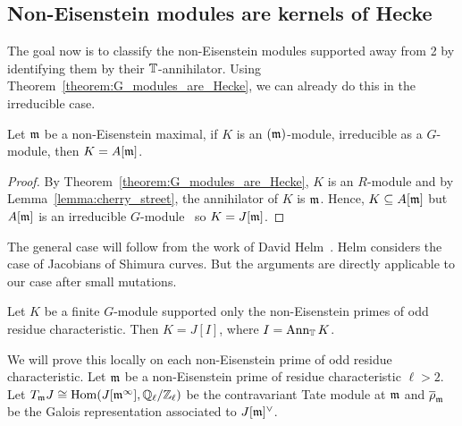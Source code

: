 \documentclass{article}
\begin{document}
\subsection{Non-Eisenstein modules are kernels of Hecke}%
\label{sub:non_eisenstein_modules_are_kernels_of_hecke}

The goal now is to classify the non-Eisenstein modules supported away from 2 by
identifying them by their $\mathbb{T}$-annihilator. Using
Theorem~\ref{theorem:G_modules_are_Hecke}, we can already do this in the
irreducible case.
\begin{corollary}
    Let $\mathfrak{m}$ be a non-Eisenstein maximal, if $K$ is an $(\mathfrak{m})$-module, irreducible
    as a $G$-module, then $K=A[\mathfrak{m}]$.
\end{corollary}
\begin{proof}
    By Theorem~\ref{theorem:G_modules_are_Hecke}, $K$ is an $R$-module and by
    Lemma~\ref{lemma:cherry_street}, the annihilator of $K$ is $\mathfrak{m}$. Hence,
    $K\subseteq A[\mathfrak{m}]$ but $A[\mathfrak{m}]$ is an irreducible
    $G$-module~\cite[Proposition 14.2]{mazur:eisenstein} so $K=J[\mathfrak{m}]$.
\end{proof}

The general case will follow from the work of David Helm~\cite{helm:jacobian}.
Helm considers the case of Jacobians of Shimura curves. But the arguments are
directly applicable to our case after small mutations. 

\begin{theorem}\label{theorem:non_eisenstein_kernel_hecke}
    Let $K$ be a finite $G$-module supported only the non-Eisenstein primes of
    odd residue characteristic. Then $K=J[I]$, where $I=\operatorname{Ann}_{\mathbb{T}} K$.
\end{theorem}

We will prove this locally on each non-Eisenstein prime of odd residue
characteristic. Let $\mathfrak{m}$ be a non-Eisenstein prime of residue characteristic
$\ell>2$. Let $T_{\mathfrak{m}} J\cong \operatorname{Hom}(J[\mathfrak{m}^\infty], \mathbb{Q}_\ell/\mathbb{Z}_\ell)$ be the
contravariant Tate module at $\mathfrak{m}$ and $\overline{\rho}_{\mathfrak{m}}$ be the Galois
representation associated to $J[\mathfrak{m}]^\vee$.
\end{document}
